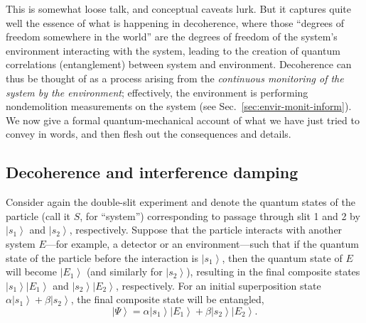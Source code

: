 \documentclass[aps,pra,reprint,amsmath,amssymb,showpacs,nofootinbib,floatfix,onecolumn,12pt]{revtex4-1}
\newcommand{\ket}[1]{\left\vert{#1}\right\rangle}
\begin{document}
This is somewhat loose talk, and conceptual caveats lurk. But it captures quite well the essence of what is happening in decoherence, where those ``degrees of freedom somewhere in the world'' are the degrees of freedom of the system's environment interacting with the system, leading to the creation of quantum correlations (entanglement) between system and environment. Decoherence can thus be thought of as a process arising from the \emph{continuous monitoring of the system by the environment}; effectively, the environment is performing nondemolition measurements on the system (see Sec.~\ref{sec:envir-monit-inform}). We now give a formal quantum-mechanical account of what we have just tried to convey in words, and then flesh out the consequences and details.


\subsection{Decoherence and interference damping}

Consider again the double-slit experiment and denote the quantum states of the particle (call it $S$, for ``system'') corresponding to passage through slit 1 and 2 by $\ket{s_1}$ and $\ket{s_2}$, respectively. Suppose that the particle interacts with another system $E$---for example, a detector or an environment---such that if the quantum state of the particle before the interaction is $\ket{s_1}$, then the quantum state of $E$ will become $\ket{E_1}$ (and similarly for $\ket{s_2}$), resulting in the final composite states $\ket{s_1}\ket{E_1}$ and $\ket{s_2}\ket{E_2}$, respectively. For an initial superposition state $\alpha\ket{s_1}+\beta\ket{s_2}$, the final composite state will be entangled,
%
\begin{equation}
\label{eq:1dlkf}
\ket{\Psi} = \alpha \ket{s_1} \ket{E_1} + \beta \ket{s_2} \ket{E_2}.
\end{equation}
%
\end{document}
